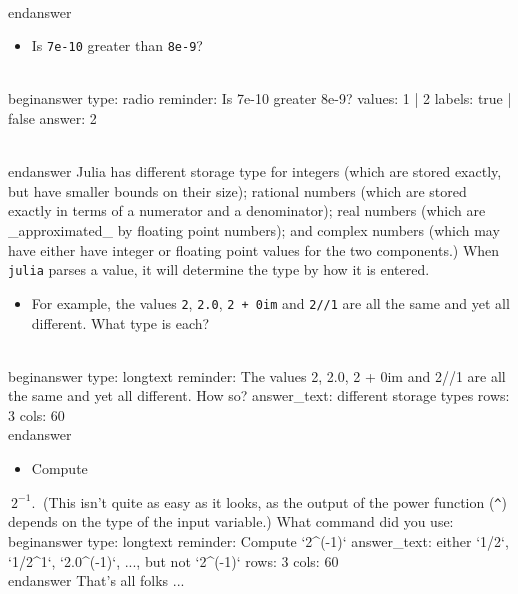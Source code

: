 \documentclass[12pt]{article}
\begin{document}
\\end{answer}
\begin{itemize}\item  Is \texttt{7e-10}  greater than \texttt{8e-9}?\end{itemize}
\\begin{answer}
type: radio
reminder: Is 7e-10 greater 8e-9?
values: 1 | 2
labels: true | false
answer: 2

\\end{answer}
\newline
Julia has different storage type for integers (which are stored exactly, but have smaller bounds on their size); rational numbers (which are stored exactly in terms of a numerator and a denominator); real numbers (which are _approximated_ by floating point numbers); and complex numbers (which may have either have integer or floating point values for the two components.) When \texttt{julia} parses a value, it will determine the type by how it is entered.\begin{itemize}\item For example, the values \texttt{2}, \texttt{2.0}, \texttt{2 + 0im} and \texttt{2//1} are all the same and yet all different. What type is each?\end{itemize}
\\begin{answer}
type: longtext
reminder: The values 2, 2.0, 2 + 0im and 2//1 are all the same and yet all different. How so?
answer_text: different storage types 
rows: 3
cols: 60
\\end{answer}
\begin{itemize}\item Compute \end{itemize}$~
2^{-1}.
~$\newline
(This isn't quite as easy as it looks, as the output of the power function (\texttt{^}) depends on the type of the input variable.)\newline
What command did you use:
\\begin{answer}
type: longtext
reminder: Compute `2^(-1)`
answer_text: either `1/2`, `1/2^1`, `2.0^(-1)`, ..., but not `2^(-1)` 
rows: 3
cols: 60
\\end{answer}
\newline
That's all folks ...
\end{document}
